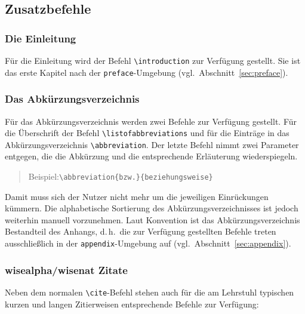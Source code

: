 \documentclass[english, trackchanges, hyperref, ngerman ,pdf, mp, mppdf]{wise}
\newcommand\code[1]{\texttt{#1}}
\newcommand\command[1]{\code{\textbackslash{}#1}}
\begin{document}
\subsection{Zusatzbefehle}


\subsubsection{Die Einleitung}

Für die Einleitung wird der Befehl \command{introduction}
zur Verfügung gestellt. Sie ist das erste Kapitel nach der \code{preface}-Umgebung
(vgl.\ Abschnitt~\ref{sec:preface}).


\subsubsection{Das Abkürzungsverzeichnis}

Für das Abkürzungsverzeichnis werden zwei Befehle zur Verfügung gestellt.
Für die Überschrift der Befehl \command{listofabbreviations}
und für die Einträge in das Abkürzungsverzeichnis \command{abbreviation}.
Der letzte Befehl nimmt zwei Parameter entgegen, die die Abkürzung
und die entsprechende Erläuterung wiederspiegeln.

\begin{quotation}
Beispiel:\command{abbreviation\{bzw.\}\{beziehungsweise\}}
\end{quotation}
Damit muss sich der Nutzer nicht mehr um die jeweiligen Einrückungen
kümmern. Die alphabetische Sortierung des Abkürzungsverzeichnisses
ist jedoch weiterhin manuell vorzunehmen. Laut Konvention ist das
Abkürzungsverzeichnis Bestandteil des Anhangs, d.\,h.\ die zur Verfügung
gestellten Befehle treten ausschließlich in der \code{appendix}-Umgebung
auf (vgl.~Abschnitt~\ref{sec:appendix}).


\subsubsection{wisealpha/wisenat Zitate}

Neben dem normalen \command{cite}-Befehl stehen auch
für die am Lehrstuhl typischen kurzen und langen Zitierweisen entsprechende
Befehle zur Verfügung:
\end{document}
